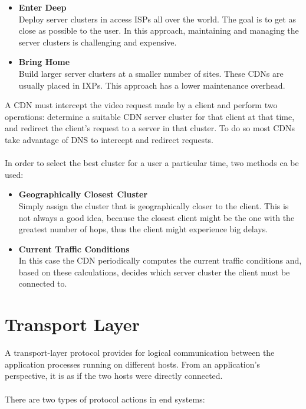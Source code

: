 \documentclass{article}
\begin{document}
\begin{itemize}
	\item \textbf{Enter Deep}
	\vspace{.2cm} \\
	Deploy server clusters in access ISPs all over the world. The goal is to get as close as possible to the user. In this approach, maintaining and managing the server clusters is challenging and expensive.
	
	\item \textbf{Bring Home}
	\vspace{.2cm} \\
	Build larger server clusters at a smaller number of sites. These CDNs are usually placed in IXPs. This approach has a lower maintenance overhead.
\end{itemize}
A CDN must intercept the video request made by a client and perform two operations: determine a suitable CDN server cluster for that client at that time, and redirect the client's request to a server in that cluster. To do so most CDNs take advantage of DNS to intercept and redirect requests. \\ \\
In order to select the best cluster for a user a particular time, two methods ca be used:
\begin{itemize}
	\item \textbf{Geographically Closest Cluster}
	\vspace{.2cm} \\
	Simply assign the cluster that is geographically closer to the client. This is not always a good idea, because the closest client might be the one with the greatest number of hops, thus the client might experience big delays.
	
	\item \textbf{Current Traffic Conditions}
	\vspace{.2cm} \\
	In this case the CDN periodically computes the current traffic conditions and, based on these calculations, decides which server cluster the client must be connected to.
\end{itemize}

\section{Transport Layer}
A transport-layer protocol provides for logical communication between the application processes running on different hosts. From an application's perspective, it is as if the two hosts were directly connected. \\ \\
There are two types of protocol actions in end systems:
\end{document}
